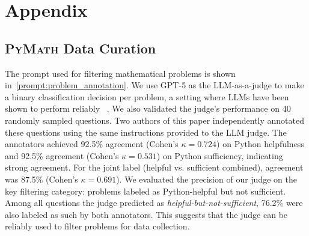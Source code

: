 \documentclass[11pt]{article}
\def \dataset{\textsc{PyMath}\xspace}
\begin{document}
\appendix

\section{Appendix}
\label{sec:appendix}
\subsection{\dataset Data Curation}
\label{appendix:data_curation}
The prompt used for filtering mathematical problems is shown in~\ref{prompt:problem_annotation}. We use GPT-5 as the LLM-as-a-judge to make a binary classification decision per problem, a setting where LLMs have been shown to perform reliably ~\citep{gu2025surveyllmasajudge}. We also validated the judge's performance on 40 randomly sampled questions. Two authors of this paper independently annotated these questions using the same instructions provided to the LLM judge. The annotators achieved 92.5\% agreement (Cohen's $\kappa= 0.724$) on Python helpfulness and 92.5\% agreement (Cohen's $\kappa= 0.531$) on Python sufficiency, indicating strong agreement. For the joint label (helpful vs. sufficient combined), agreement was 87.5\% (Cohen's $\kappa= 0.691$). We evaluated the precision of our judge on the key filtering category: problems labeled as Python-helpful but not sufficient. Among all questions the judge predicted as \textit{helpful-but-not-sufficient}, 76.2\% were also labeled as such by both annotators. This suggests that the judge can be reliably used to filter problems for data collection.
\end{document}
